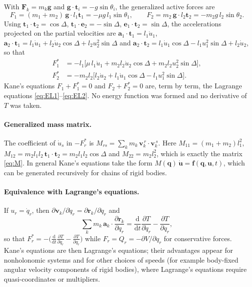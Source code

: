\documentclass[11pt,a4paper]{book}
\theoremstyle{definition}
\theoremstyle{remark}
\newcommand{\dd}{\mathrm{d}}
\begin{document}
With $\bm F_k=m_k\bm g$ and $\bm g\cdot\bm t_i=-g\sin\theta_i$, the generalized active forces are
\begin{equation}
  F_1=(m_1+m_2)\,\bm g\cdot l_1\bm t_1=-\mu g\,l_1\sin\theta_1,\qquad
  F_2=m_2\,\bm g\cdot l_2\bm t_2=-m_2g\,l_2\sin\theta_2 .
\end{equation}
Using $\bm t_1\!\cdot\!\bm t_2=\cos\Delta$, $\bm t_1\!\cdot\!\bm e_2=-\sin\Delta$, $\bm e_1\!\cdot\!\bm t_2=\sin\Delta$,
the accelerations projected on the partial velocities are $\bm a_1\!\cdot\!\bm t_1=l_1\dot u_1$,
$\bm a_2\!\cdot\!\bm t_1=l_1\dot u_1+l_2\dot u_2\cos\Delta+l_2u_2^2\sin\Delta$ and
$\bm a_2\!\cdot\!\bm t_2=l_1\dot u_1\cos\Delta-l_1u_1^2\sin\Delta+l_2\dot u_2$, so that
\begin{align}
  F_1^*&=-l_1\Big[\mu\,l_1\dot u_1+m_2l_2\dot u_2\cos\Delta+m_2l_2u_2^2\sin\Delta\Big],\\
  F_2^*&=-m_2l_2\Big[l_2\dot u_2+l_1\dot u_1\cos\Delta-l_1u_1^2\sin\Delta\Big].
\end{align}
Kane's equations $F_1+F_1^*=0$ and $F_2+F_2^*=0$ are, term by term, the Lagrange equations
\eqref{eq:EL1}--\eqref{eq:EL2}. No energy function was formed and no derivative of $T$ was taken.

\paragraph{Generalized mass matrix.} The coefficient of $\dot u_s$ in $-F_r^*$ is
$M_{rs}=\sum_km_k\,\bm v_k^{\,r}\!\cdot\bm v_k^{\,s}$. Here
$M_{11}=(m_1+m_2)l_1^2$, $M_{12}=m_2l_1l_2\,\bm t_1\!\cdot\!\bm t_2=m_2l_1l_2\cos\Delta$ and $M_{22}=m_2l_2^2$,
which is exactly the matrix \eqref{eq:M}. In general Kane's equations take the form
$M(\bm q)\,\dot{\bm u}=\bm f(\bm q,\bm u,t)$, which can be generated recursively for chains of rigid bodies.

\paragraph{Equivalence with Lagrange's equations.} If $u_r=\dot q_r$, then $\partial\bm v_k/\partial\dot q_r=\partial\bm r_k/\partial q_r$ and
\[
  \sum_km_k\,\bm a_k\!\cdot\!\frac{\partial\bm r_k}{\partial q_r}
  =\frac{\dd}{\dd t}\frac{\partial T}{\partial\dot q_r}-\frac{\partial T}{\partial q_r},
\]
so that $F_r^*=-\big(\frac{\dd}{\dd t}\frac{\partial T}{\partial\dot q_r}-\frac{\partial T}{\partial q_r}\big)$ while
$F_r=Q_r=-\partial V/\partial q_r$ for conservative forces. Kane's equations are then Lagrange's equations; their
advantages appear for nonholonomic systems and for other choices of speeds (for example body-fixed angular velocity
components of rigid bodies), where Lagrange's equations require quasi-coordinates or multipliers.
\end{document}
